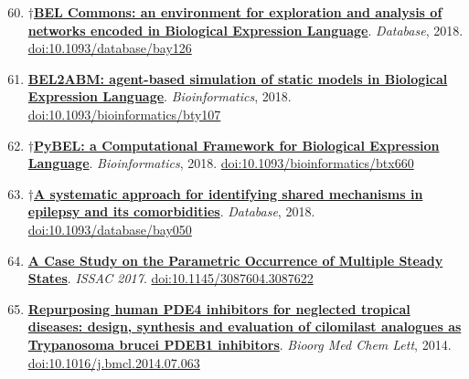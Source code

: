 \documentclass[10pt,a4paper,sans]{moderncv} %
\newcommand{\wikidata}[2]{\href{https://bioregistry.io/wikidata:#1?provider=scholia}{{#2}}}
\begin{document}
    \begin{enumerate}
    \setcounter{enumi}{59}
    \itemsep0.5em
        \item
        $\dagger$\wikidata{Q60302045}{\textbf{BEL Commons: an environment for exploration and analysis of networks encoded in Biological Expression Language}}.
    \textit{Database}, 2018.  {\scriptsize \href{https://bioregistry.io/doi:10.1093/DATABASE/BAY126}{doi:10.1093/database/bay126}}
        \item
        \wikidata{Q51056857}{\textbf{BEL2ABM: agent-based simulation of static models in Biological Expression Language}}.
    \textit{Bioinformatics}, 2018.  {\scriptsize \href{https://bioregistry.io/doi:10.1093/BIOINFORMATICS/BTY107}{doi:10.1093/bioinformatics/bty107}}
        \item
        $\dagger$\wikidata{Q42695788}{\textbf{PyBEL: a Computational Framework for Biological Expression Language}}.
    \textit{Bioinformatics}, 2018.  {\scriptsize \href{https://bioregistry.io/doi:10.1093/BIOINFORMATICS/BTX660}{doi:10.1093/bioinformatics/btx660}}
        \item
        $\dagger$\wikidata{Q55315340}{\textbf{A systematic approach for identifying shared mechanisms in epilepsy and its comorbidities}}.
    \textit{Database}, 2018.  {\scriptsize \href{https://bioregistry.io/doi:10.1093/DATABASE/BAY050}{doi:10.1093/database/bay050}}
    \end{enumerate}
    \begin{enumerate}
    \setcounter{enumi}{63}
    \itemsep0.5em
        \item
        \wikidata{Q47479157}{\textbf{A Case Study on the Parametric Occurrence of Multiple Steady States}}.
    \textit{ISSAC 2017}.  {\scriptsize \href{https://bioregistry.io/doi:10.1145/3087604.3087622}{doi:10.1145/3087604.3087622}}
    \end{enumerate}
    \begin{enumerate}
    \setcounter{enumi}{64}
    \itemsep0.5em
        \item
        \wikidata{Q34138086}{\textbf{Repurposing human PDE4 inhibitors for neglected tropical diseases: design, synthesis and evaluation of cilomilast analogues as Trypanosoma brucei PDEB1 inhibitors}}.
    \textit{Bioorg Med Chem Lett}, 2014.  {\scriptsize \href{https://bioregistry.io/doi:10.1016/J.BMCL.2014.07.063}{doi:10.1016/j.bmcl.2014.07.063}}
    \end{enumerate}
\end{document}
